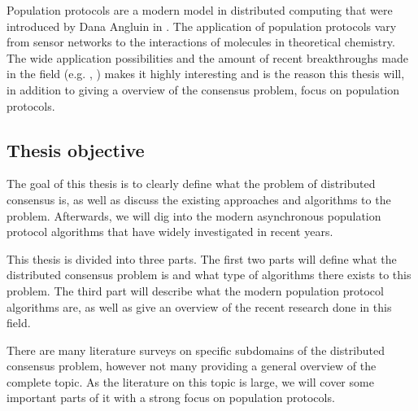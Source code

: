 Population protocols are a modern model in distributed computing that were introduced by Dana Angluin in \cite{angluinComputationNetworksPassively2006}. The application of population protocols vary from sensor networks to the interactions of molecules in theoretical chemistry. \cite{aspnesIntroductionPopulationProtocols2009} The wide application possibilities and the amount of recent breakthroughs made in the field (e.g. \cite{dotyTimeSpaceOptimal2022}, \cite{bankhamerPopulationProtocolsExact2022}) makes it highly interesting and is the reason this thesis will, in addition to giving a overview of the consensus problem, focus on population protocols.

\clearpage

\subsection{Thesis objective}
The goal of this thesis is to clearly define what the problem of distributed consensus is, as well as discuss the existing approaches and algorithms to the problem. Afterwards, we will dig into the modern asynchronous population protocol algorithms that have widely investigated in recent years. 

This thesis is divided into three parts. The first two parts will define what the distributed consensus problem is and what type of algorithms there exists to this problem. The third part will describe what the modern population protocol algorithms are, as well as give an overview of the recent research done in this field.

There are many literature surveys on specific subdomains of the distributed consensus problem, however not many providing a general overview of the complete topic. As the literature on this topic is large, we will cover some important parts of it with a strong focus on population protocols.


\clearpage